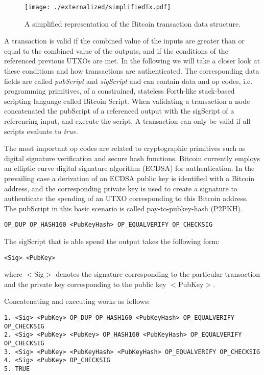 \begin{figure}
\centering
\texttt{[image: ./externalized/simplifiedTx.pdf]}
\caption{A simplified representation of the Bitcoin transaction data structure.}
\label{fig:bitcointx}
\end{figure}

A transaction is valid if the combined value of the inputs are greater than or equal to the combined value of the outputs, and if the conditions of the referenced previous UTXOs are met.
In the following we will take a closer look at these conditions and how transactions are authenticated. The corresponding data fields are called \emph{pubScript} and \emph{sigScript} and can contain data and op codes, i.e. programming primitives, of a constrained, stateless Forth-like stack-based scripting language called Bitcoin Script. 
When validating a transaction a node concatenated the pubScript of a referenced output with the sigScript of a referencing input, and execute the script. A transaction can only be valid if all  scripts evaluate to \emph{true}. 

The most important op codes are related to cryptographic primitives such as digital signature verification and secure hash functions. Bitcoin currently employs an elliptic curve digital signature algorithm (ECDSA) for authentication. In the prevailing case a derivation of an ECDSA public key is identified with a Bitcoin address, and the corresponding private key is used to create a signature to authenticate the spending of an UTXO corresponding to this Bitcoin address. 
The pubScript in this basic scenario is called pay-to-pubkey-hash (P2PKH).

\begin{lstlisting}
OP_DUP OP_HASH160 <PubKeyHash> OP_EQUALVERIFY OP_CHECKSIG
\end{lstlisting}

The sigScript that is able spend the output takes the following form:

\begin{lstlisting}
<Sig> <PubKey>
\end{lstlisting}

where $<$Sig$>$ denotes the signature corresponding to the particular transaction and the private key corresponding to the public key $<$PubKey$>$.

Concatenating and executing works as follows:

\begin{lstlisting}[breaklines]
1. <Sig> <PubKey> OP_DUP OP_HASH160 <PubKeyHash> OP_EQUALVERIFY OP_CHECKSIG
2. <Sig> <PubKey> <PubKey> OP_HASH160 <PubKeyHash> OP_EQUALVERIFY OP_CHECKSIG
3. <Sig> <PubKey> <PubKeyHash> <PubKeyHash> OP_EQUALVERIFY OP_CHECKSIG
4. <Sig> <PubKey> OP_CHECKSIG
5. TRUE
\end{lstlisting}

